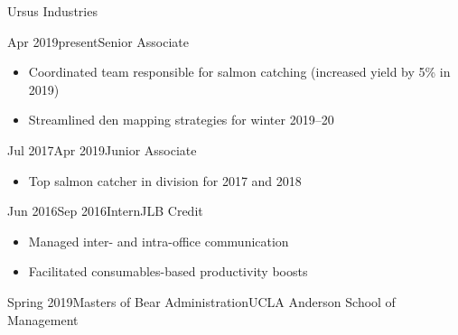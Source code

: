 \documentclass[11pt,oneside,letterpaper]{article}
\begin{document}

\begin{contactinfo}
  \address{1919 Westwood Blvd. \\ Los Angeles, CA 90024}
\end{contactinfo}


\begin{multiposition}{Ursus Industries}
  \begin{position}{Apr 2019}{present}{Senior Associate}
    \begin{itemize}
      \item Coordinated team responsible for salmon catching (increased yield
      by 5\% in 2019)
      \item Streamlined den mapping strategies for winter 2019--20
    \end{itemize}
  \end{position}
  \begin{position}{Jul 2017}{Apr 2019}{Junior Associate}
    \begin{itemize}
      \item Top salmon catcher in division for 2017 and 2018
    \end{itemize}
  \end{position}
\end{multiposition}

\begin{job}{Jun 2016}{Sep 2016}{Intern}{JLB Credit}
  \begin{itemize}
    \item Managed inter- and intra-office communication
    \item Facilitated consumables-based productivity boosts
  \end{itemize}
\end{job}


\begin{degree}{Spring 2019}{Masters of Bear Administration}{UCLA Anderson
    School of Management}
\end{degree}
\end{document}
